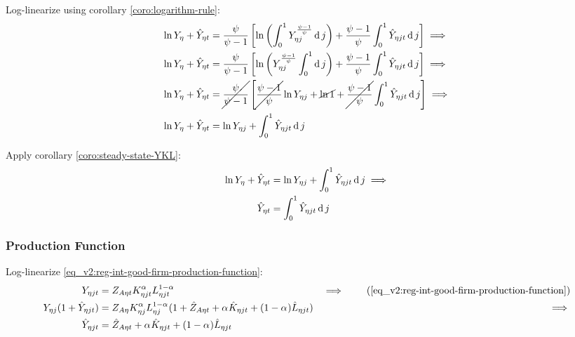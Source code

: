 \documentclass[../thesis.tex]{subfiles}
\begin{document}
Log-linearize using corollary \ref{coro:logarithm-rule}:
\begin{align}
	\ln{Y_{\eta}} + \hat{Y}_{\eta t} &= \frac{\psi}{\psi-1} \left[ \ln \left( \int_{0}^{1} Y_{\eta j}^{\frac{\psi-1}{\psi}} \operatorname{d} j \right) + \frac{\psi-1}{\psi} \int_{0}^{1} \hat{Y}_{\eta jt} \operatorname{d} j \right] \implies \nonumber
	\\
	\ln{Y_{\eta}} + \hat{Y}_{\eta t} &= \frac{\psi}{\psi-1} \left[ \ln \left( Y_{\eta j}^{\frac{\psi-1}{\psi}} \int_{0}^{1} \operatorname{d} j \right) + \frac{\psi-1}{\psi} \int_{0}^{1} \hat{Y}_{\eta jt} \operatorname{d} j \right] \implies \nonumber
	\\
	\ln{Y_{\eta}} + \hat{Y}_{\eta t} &= \cancel{\frac{\psi}{\psi-1}} \left[ \cancel{\frac{\psi-1}{\psi}} \ln{Y_{\eta j}} + \cancel{\ln1} + \cancel{\frac{\psi-1}{\psi}} \int_{0}^{1} \hat{Y}_{\eta jt} \operatorname{d} j \right] \implies \nonumber
	\\
	\ln{Y_{\eta}} + \hat{Y}_{\eta t} &= \ln{Y_{\eta j}} + \int_{0}^{1} \hat{Y}_{\eta jt} \operatorname{d} j \nonumber
\end{align}

Apply corollary \ref{coro:steady-state-YKL}:
\begin{align}
	\ln{Y_{\eta}} + \hat{Y}_{\eta t} &= \ln{Y_{\eta j}} + \int_{0}^{1} \hat{Y}_{\eta jt} \operatorname{d} j \implies \nonumber \\
	\hat{Y}_{\eta t} &= \int_{0}^{1} \hat{Y}_{\eta jt} \operatorname{d} j 
	\label{eq_v2:reg-ll-final-goods-firm-bundle-rule}
\end{align}


\subsubsection*{Production Function}

Log-linearize \ref{eq_v2:reg-int-good-firm-production-function}:
\begin{alignat}{2}
	Y_{\eta jt} &= Z_{A\eta t} K_{\eta jt}^{\alpha_{}} L_{\eta jt}^{1-{\alpha_{}}} &\implies \tag{\ref{eq_v2:reg-int-good-firm-production-function}} \\
	Y_{\eta j} (1+ \hat{Y}_{\eta jt}) &= Z_{A\eta} K_{\eta j}^{\alpha_{}} L_{\eta j}^{1-{\alpha_{}}} (1+ \hat{Z}_{A\eta t} + {\alpha_{}} \hat{K}_{\eta jt} + (1-{\alpha_{}}) \hat{L}_{\eta jt}) &\implies \nonumber \\
	\hat{Y}_{\eta jt} &= \hat{Z}_{A\eta t} + {\alpha_{}} \hat{K}_{\eta jt} + (1-{\alpha_{}}) \hat{L}_{\eta jt} \label{eq_v2:reg-ll-int-good-firm-production-function}
\end{alignat}
\end{document}
